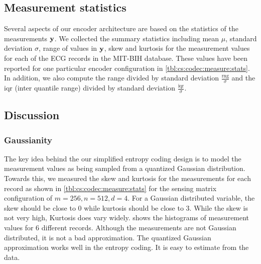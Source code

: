 \subsection{Measurement statistics}
Several aspects of our encoder architecture are based on the
statistics of the measurements $\mathbf{y}$. We collected the summary
statistics including mean $\mu$, standard deviation $\sigma$,
range of values in $\mathbf{y}$, skew and kurtosis
for the measurement values for each
of the ECG records in the MIT-BIH database. These values
have been reported for one particular encoder configuration
in \cref{tbl:cs:codec:measure:stats}.
In addition, we also compute the range divided by standard deviation
$\frac{\text{rng}}{\sigma}$
and the iqr (inter quantile range) divided by standard deviation
$\frac{\text{iqr}}{\sigma}$.

\subsection{Discussion}

\subsubsection{Gaussianity}

The key idea behind the our simplified entropy coding
design is to model the measurement values as being sampled from a quantized
Gaussian distribution. Towards this, we measured the
skew and kurtosis for the measurements for each record
as shown in \cref{tbl:cs:codec:measure:stats}
for the sensing matrix configuration of $m=256,n=512,d=4$.
For a Gaussian distributed variable,
the skew should be close to $0$ while kurtosis should be close to $3$.
While the skew is not very high, Kurtosis does vary widely.
 shows the histograms of measurement
values for 6 different records. Although the measurements are not
Gaussian distributed, it is not a bad approximation.
The quantized Gaussian approximation works well in the entropy
coding. It is easy to estimate from the data.

